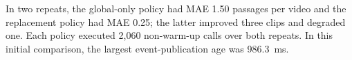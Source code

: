 In two repeats, the global-only policy had MAE 1.50 passages per video and the replacement policy had MAE 0.25; the latter improved three clips and degraded one. Each policy executed 2,060 non-warm-up calls over both repeats. In this initial comparison, the largest event-publication age was 986.3~ms. 
